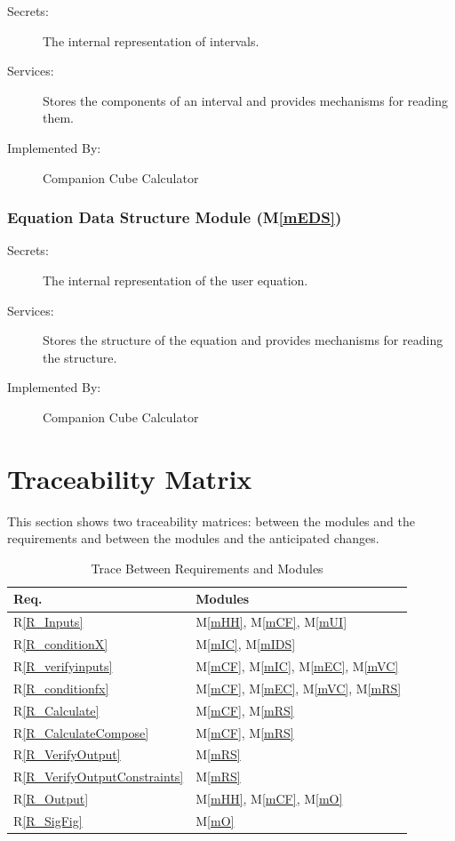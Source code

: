 \documentclass[12pt, titlepage]{article}
\newcommand{\rref}[1]{R\ref{#1}}
\newcommand{\mref}[1]{M\ref{#1}}
\newcommand{\progname}{Companion Cube Calculator} %
\begin{document}
\begin{description}
	\item[Secrets:]The internal representation of intervals.
	\item[Services:]Stores the components of an interval and provides 
	mechanisms for reading them.
	\item[Implemented By:] \progname{}
\end{description}

\subsubsection{Equation Data Structure Module (\mref{mEDS})}

\begin{description}
	\item[Secrets:]The internal representation of the user equation.
	\item[Services:]Stores the structure of the equation and provides 
	mechanisms for reading the structure.
	\item[Implemented By:] \progname{}
\end{description}

\section{Traceability Matrix} \label{SecTM}

This section shows two traceability matrices: between the modules and the
requirements and between the modules and the anticipated changes.

\begin{table}[H]
\centering
\begin{tabular}{p{} p{}}
\toprule
\textbf{Req.} & \textbf{Modules}\\
\midrule
\rref{R_Inputs} & \mref{mHH}, \mref{mCF}, \mref{mUI}\\
\rref{R_conditionX} & \mref{mIC}, \mref{mIDS}\\
\rref{R_verifyinputs} & \mref{mCF}, \mref{mIC}, \mref{mEC}, \mref{mVC}\\
\rref{R_conditionfx} & \mref{mCF}, \mref{mEC}, \mref{mVC}, \mref{mRS}\\
\rref{R_Calculate} & \mref{mCF}, \mref{mRS}\\
\rref{R_CalculateCompose} & \mref{mCF}, \mref{mRS}\\
\rref{R_VerifyOutput} & \mref{mRS}\\
\rref{R_VerifyOutputConstraints} & \mref{mRS}\\
\rref{R_Output} & \mref{mHH}, \mref{mCF}, \mref{mO}\\
\rref{R_SigFig} & \mref{mO}\\
\bottomrule
\end{tabular}
\caption{Trace Between Requirements and Modules}
\label{TblRT}
\end{table}
\end{document}

